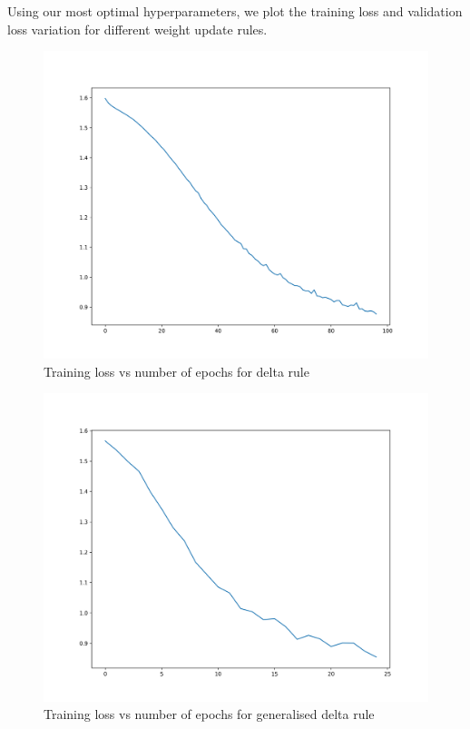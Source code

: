 \documentclass[10pt,a4paper]{article}
\begin{document}
Using our most optimal hyperparameters, we plot the training loss and validation loss variation for different weight update rules.

\begin{figure}%
    \centering
    \includegraphics[scale=0.4]{delta_training_loss_0.0001.png}%
    \caption{Training loss vs number of epochs for delta rule}%
    \label{fig:15}%
\end{figure}


\begin{figure}%
    \centering
    \includegraphics[scale=0.4]{gen_delta_training_loss_0.0001.png}%
    \caption{Training loss vs number of epochs for generalised delta rule}%
    \label{fig:16}%
\end{figure}
\end{document}
